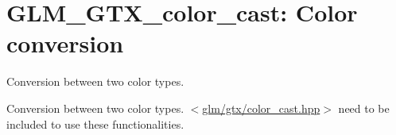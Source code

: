 \hypertarget{group__gtx__color__cast}{\section{\-G\-L\-M\-\_\-\-G\-T\-X\-\_\-color\-\_\-cast\-: \-Color conversion}
\label{group__gtx__color__cast}
}


\-Conversion between two color types.  


\-Conversion between two color types. $<$\hyperlink{color__cast_8hpp}{glm/gtx/color\-\_\-cast.\-hpp}$>$ need to be included to use these functionalities. 